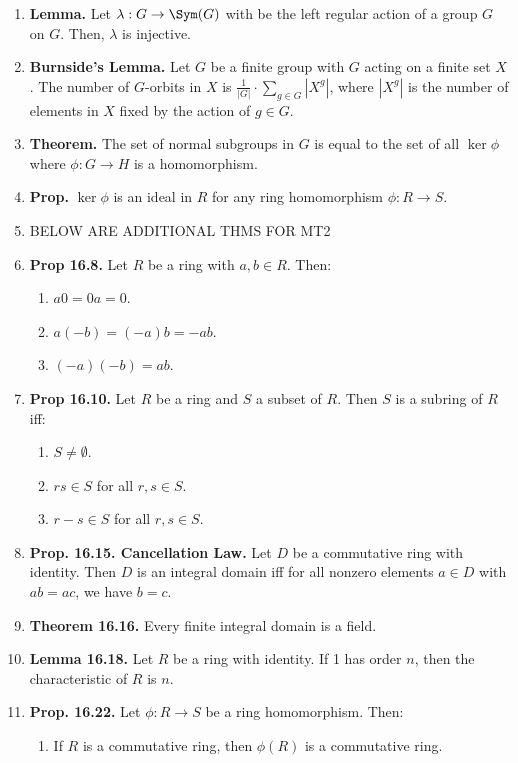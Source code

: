 \begin{enumerate}
	\item \textbf{Lemma. } Let $\lambda: G \to \Sym(G)$ with be the left regular action of a group $G$ on $G$. Then, $\lambda$ is injective. 
	\item \textbf{Burnside's Lemma. } Let $G$ be a finite group with $G$ acting on a finite set $X$. The number of $G$-orbits in $X$ is $\frac{1}{|G|} \cdot \sum_{g \in G} |X^g|$, where $|X^g|$ is the number of elements in $X$ fixed by the action of $g \in G$. 
	\item \textbf{Theorem. } The set of normal subgroups in $G$ is equal to the set of all $\ker \phi$ where $\phi: G \to H$ is a homomorphism. 
	\item \textbf{Prop. } $\ker\phi$ is an ideal in $R$ for any ring homomorphism $\phi: R \to S$. 
	\item BELOW ARE ADDITIONAL THMS FOR MT2
	\item \textbf{Prop 16.8. } Let $R$ be a ring with $a,b \in R$. Then: 
	\begin{enumerate}
		\item $a0=0a=0$. 
		\item $a(-b)=(-a)b=-ab$. 
		\item $(-a)(-b) = ab$. 
	\end{enumerate}
	\item \textbf{Prop 16.10. } Let $R$ be a ring and $S$ a subset of $R$. Then $S$ is a subring of $R$ iff: 
	\begin{enumerate}
		\item $S \neq \emptyset$. 
		\item $rs \in S$ for all $r,s \in S$. 
		\item $r-s \in S$ for all $r,s \in S$. 
	\end{enumerate}
	\item \textbf{Prop. 16.15. Cancellation Law. } Let $D$ be a commutative ring with identity. Then $D$ is an integral domain iff for all nonzero elements $a \in D$ with $ab=ac$, we have $b=c$. 
        \item \textbf{Theorem 16.16. } Every finite integral domain is a field. 
        \item \textbf{Lemma 16.18. } Let $R$ be a ring with identity. If 1 has order $n$, then the characteristic of $R$ is $n$. 
	\item \textbf{Prop. 16.22. } Let $\phi:R \to S$ be a ring homomorphism. Then: 
        \begin{enumerate}
            \item If $R$ is a commutative ring, then $\phi(R)$ is a commutative ring. 

\end{enumerate}
\end{enumerate}
